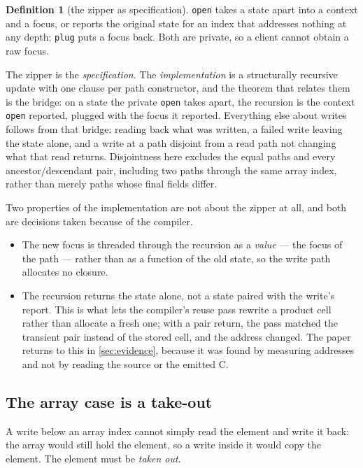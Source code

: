 \documentclass[11pt,a4paper]{article}
\theoremstyle{definition}
\newtheorem{definition}{Definition}[section]
\theoremstyle{plain}
\newcommand{\code}[1]{\texttt{#1}}
\begin{document}
\begin{definition}[the zipper as specification]\label{def:zipper}
\code{open} takes a state apart into a context and a focus, or reports the
original state for an index that addresses nothing at any depth; \code{plug}
puts a focus back. Both are private, so a client cannot obtain a raw focus.
\end{definition}

The zipper is the \emph{specification}. The \emph{implementation} is a
structurally recursive update with one clause per path constructor, and the
theorem that relates them is the bridge: on a state the private \code{open} takes
apart, the recursion is the context \code{open} reported, plugged with the focus
it reported. Everything else about writes follows from that bridge: reading back
what was written, a failed write leaving the state alone, and a write at a path
disjoint from a read path not changing what that read returns. Disjointness here
excludes the equal paths and every ancestor/descendant pair, including two paths
through the same array index, rather than merely paths whose final fields differ.

Two properties of the implementation are not about the zipper at all, and both
are decisions taken because of the compiler.

\begin{itemize}[leftmargin=1.4em,itemsep=2pt]
\item The new focus is threaded through the recursion as a \emph{value} --- the
focus of the path --- rather than as a function of the old state, so the write
path allocates no closure.
\item The recursion returns the state alone, not a state paired with the write's
report. This is what lets the compiler's reuse pass rewrite a product cell rather
than allocate a fresh one; with a pair return, the pass matched the transient
pair instead of the stored cell, and the address changed. The paper returns to
this in \cref{sec:evidence}, because it was found by measuring addresses and not
by reading the source or the emitted C.
\end{itemize}

\subsection{The array case is a take-out}

A write below an array index cannot simply read the element and write it back:
the array would still hold the element, so a write inside it would copy the
element. The element must be \emph{taken out}.
\end{document}
